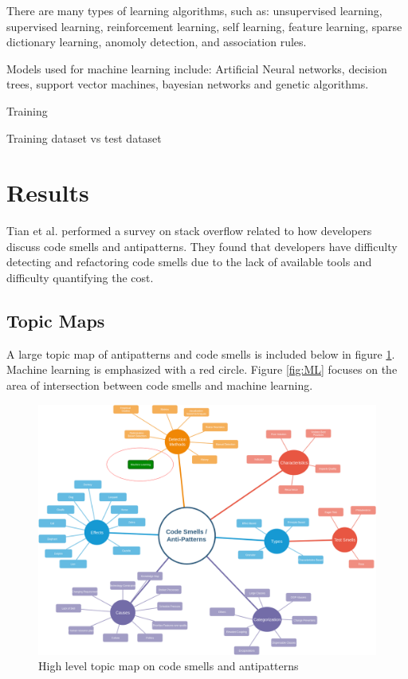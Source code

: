 \documentclass[conference]{IEEEtran}
\begin{document}
There are many types of learning algorithms, such as: unsupervised learning, supervised learning, reinforcement learning, self learning, feature learning, sparse dictionary learning, anomoly detection, and association rules.

Models used for machine learning include: Artificial Neural networks, decision trees, support vector machines, bayesian networks and genetic algorithms.

Training

Training dataset vs test dataset

\section{Results}
Tian et al.\cite{tian_how_2019} performed a survey on stack overflow related to how developers discuss code smells and antipatterns. They found that developers have difficulty detecting and refactoring code smells due to the lack of available tools and difficulty quantifying the cost.
\subsection{Topic Maps}

A large topic map of antipatterns and code smells is included below in figure \ref{fig:TM}.
Machine learning is emphasized with a red circle. 
Figure \ref{fig:ML} focuses on the area of intersection between code smells and machine learning.
\begin{figure}[ht]
  \centerline{\includegraphics[width=\linewidth]{AntiPattern-TopicMap.png}}
  \caption{High level topic map on code smells and antipatterns}
  \label{fig:TM}
\end{figure} 
\end{document}
